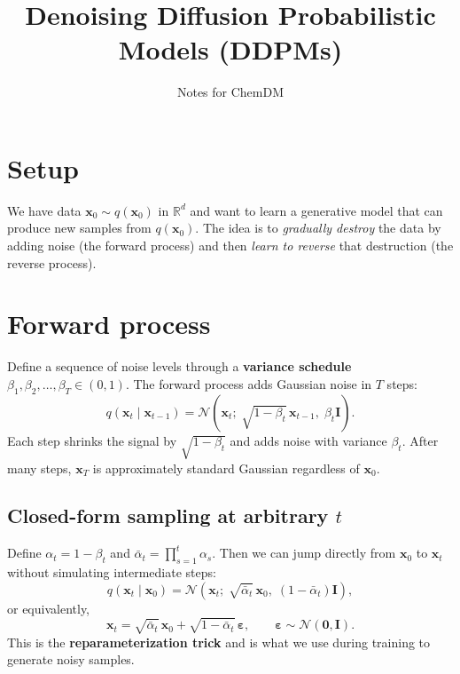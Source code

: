 \documentclass[11pt]{article}
\title{Denoising Diffusion Probabilistic Models (DDPMs)}
\author{Notes for ChemDM}
\date{}
\newcommand{\xb}{\bm{x}}
\newcommand{\eps}{\bm{\varepsilon}}
\newcommand{\abar}{\bar{\alpha}}
\newcommand{\R}{\mathbb{R}}
\newcommand{\N}{\mathcal{N}}
\begin{document}
\maketitle

\section{Setup}

We have data $\xb_0 \sim q(\xb_0)$ in $\R^d$ and want to learn a generative
model that can produce new samples from $q(\xb_0)$.  The idea is to
\emph{gradually destroy} the data by adding noise (the forward process) and
then \emph{learn to reverse} that destruction (the reverse process).

\section{Forward process}

Define a sequence of noise levels through a \textbf{variance schedule}
$\beta_1, \beta_2, \ldots, \beta_T \in (0,1)$.  The forward process adds
Gaussian noise in $T$ steps:
\begin{equation}
    q(\xb_t \mid \xb_{t-1})
    = \N\!\left(\xb_t;\; \sqrt{1 - \beta_t}\,\xb_{t-1},\; \beta_t \bm{I}\right).
\end{equation}
Each step shrinks the signal by $\sqrt{1-\beta_t}$ and adds noise with
variance $\beta_t$.  After many steps, $\xb_T$ is approximately standard
Gaussian regardless of $\xb_0$.

\subsection{Closed-form sampling at arbitrary $t$}

Define $\alpha_t = 1 - \beta_t$ and $\abar_t = \prod_{s=1}^{t} \alpha_s$.
Then we can jump directly from $\xb_0$ to $\xb_t$ without simulating
intermediate steps:
\begin{equation}\label{eq:q_sample}
    q(\xb_t \mid \xb_0)
    = \N\!\left(\xb_t;\; \sqrt{\abar_t}\,\xb_0,\;
      (1 - \abar_t)\bm{I}\right),
\end{equation}
or equivalently,
\begin{equation}\label{eq:reparam}
    \xb_t = \sqrt{\abar_t}\,\xb_0 + \sqrt{1 - \abar_t}\,\eps,
    \qquad \eps \sim \N(\bm{0}, \bm{I}).
\end{equation}
This is the \textbf{reparameterization trick} and is what we use during
training to generate noisy samples.
\end{document}
